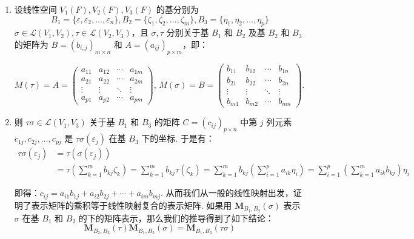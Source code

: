 \begin{enumerate}
    \item 设线性空间 $V_1(F), V_2(F), V_3(F)$ 的基分别为
    \[B_1 = \{\varepsilon, \varepsilon_2,\ldots,\varepsilon_n\}, B_2 = \{\zeta_1,\zeta_2,\ldots,\zeta_m\}, B_3 = \{\eta_1,\eta_2,\ldots,\eta_p\}\]
    $\sigma \in \mathcal{L}(V_1,V_2), \tau \in \mathcal{L}(V_2,V_3)$，且 $\sigma, \tau$ 分别关于基 $B_1$ 和 $B_2$ 及基 $B_2$ 和 $B_3$ 的矩阵为 $B=(b_{i,j})_{m \times n}$ 和 $A=(a_{ij})_{p\times m}$，即：

          $M(\tau)=A=\begin{pmatrix}
                  a_{11} & a_{12} & \cdots & a_{1m} \\
                  a_{21} & a_{22} & \cdots & a_{2m} \\
                  \vdots & \vdots & \ddots & \vdots \\
                  a_{p1} & a_{p2} & \cdots & a_{pm}
              \end{pmatrix}$,
          $M(\sigma)=B=\begin{pmatrix}
                  b_{11} & b_{12} & \cdots & b_{1n} \\
                  b_{21} & b_{22} & \cdots & b_{2n} \\
                  \vdots & \vdots & \ddots & \vdots \\
                  b_{m1} & b_{m2} & \cdots & b_{mn}
              \end{pmatrix}$.

    \item 则 $\tau\sigma \in \mathcal{L}(V_1,V_3)$ 关于基 $B_1$ 和 $B_3$ 的矩阵 $C=(c_{ij})_{p\times n}$ 中第 $j$ 列元素 $c_{1j},c_{2j},\ldots,c_{pj}$ 是 $\tau\sigma(\varepsilon_j)$ 在基 $B_3$ 下的坐标. 于是有：
          \begin{align*}
            \tau\sigma(\varepsilon_j) &= \tau(\sigma(\varepsilon_j)) \\
            &= \tau\left(\sum_{k=1}^{m}b_{kj}\zeta_k\right) = \sum_{k=1}^{m}b_{kj}\tau(\zeta_k) = \sum_{k=1}^{m}b_{kj}\left(\sum_{i=1}^{p}a_{ik}\eta_i\right) = \sum_{i=1}^{p}\left(\sum_{k=1}^{m}a_{ik}b_{kj}\right)\eta_i
          \end{align*}

          即得：$c_{ij}=a_{i1}b_{1j}+a_{i2}b_{2j}+\cdots+a_{im}b_{mj}$. 从而我们从一般的线性映射出发，证明了表示矩阵的乘积等于线性映射复合的表示矩阵. 如果用 $\mathbf{M}_{ B_1, B_2}(\sigma)$ 表示 $\sigma$ 在基 $B_1$ 和 $B_2$ 的下的矩阵表示，那么我们的推导得到了如下结论：
          \begin{equation} \label{eq:矩阵乘法的定义}
            \mathbf{M}_{ B_2, B_3} (\tau) \mathbf{M}_{ B_1, B_2} (\sigma) = \mathbf{M}_{ B_1, B_3} (\tau \sigma)
          \end{equation}


\end{enumerate}
